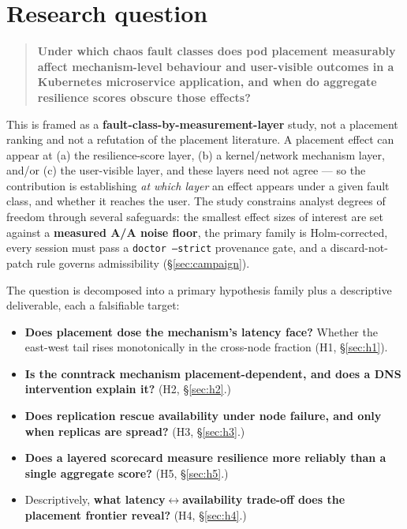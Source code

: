 \section{Research question}\label{sec:rq}

\begin{quote}
\textbf{Under which chaos fault classes does pod placement measurably affect
mechanism-level behaviour and user-visible outcomes in a Kubernetes
microservice application, and when do aggregate resilience scores obscure
those effects?}
\end{quote}

This is framed as a \textbf{fault-class-by-measurement-layer} study, not a
placement ranking and not a refutation of the placement literature. A placement
effect can appear at (a) the resilience-score layer, (b) a kernel/network
mechanism layer, and/or (c) the user-visible layer, and these layers need not
agree --- so the contribution is establishing \emph{at which layer} an effect
appears under a given fault class, and whether it reaches the user. The study
constrains analyst degrees of freedom through several safeguards: the smallest
effect sizes of interest are set against a \textbf{measured A/A noise floor}, the
primary family is Holm-corrected, every session must pass a \texttt{doctor
--strict} provenance gate, and a discard-not-patch rule governs admissibility
(\S\ref{sec:campaign}).

The question is decomposed into a primary hypothesis family plus a
descriptive deliverable, each a falsifiable target:

\begin{itemize}
\item \textbf{Does placement dose the mechanism's latency face?} Whether the
  east-west tail rises monotonically in the cross-node fraction (H1,
  \S\ref{sec:h1}).
\item \textbf{Is the conntrack mechanism placement-dependent, and does a DNS
  intervention explain it?} (H2, \S\ref{sec:h2}.)
\item \textbf{Does replication rescue availability under node failure, and only
  when replicas are spread?} (H3, \S\ref{sec:h3}.)
\item \textbf{Does a layered scorecard measure resilience more reliably than a
  single aggregate score?} (H5, \S\ref{sec:h5}.)
\item Descriptively, \textbf{what latency$\leftrightarrow$availability trade-off
  does the placement frontier reveal?} (H4, \S\ref{sec:h4}.)
\end{itemize}

